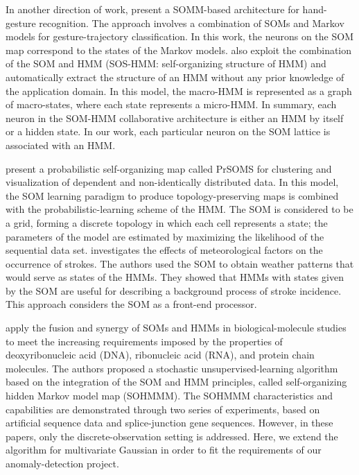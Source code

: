 In another direction of work, \citet{Caridakis2010} present a SOMM-based architecture for hand-gesture recognition. The approach involves a combination of SOMs and Markov models for gesture-trajectory classification. In this work, the neurons on the SOM map correspond to the states of the Markov models. \citet{Jaziri2011} also exploit the combination of the SOM and HMM (SOS-HMM: self-organizing structure of HMM) and automatically extract the structure of an HMM without any prior knowledge of the application domain. In this model, the macro-HMM is represented as a graph of macro-states, where each state represents a micro-HMM. In summary, each neuron in the SOM-HMM collaborative architecture is either an HMM by itself or a hidden state. In our work, each particular neuron on the SOM lattice is associated with an HMM.

\citet{Lebbah2015} present a probabilistic self-organizing map called PrSOMS for clustering and visualization of dependent and non-identically distributed data. In this model, the SOM learning paradigm to produce topology-preserving maps is combined with the probabilistic-learning scheme of the HMM. The SOM is considered to be a grid, forming a discrete topology in which each cell represents a state; the parameters of the model are estimated by maximizing the likelihood of the sequential data set. \citet{Morimoto2016} investigates the effects of meteorological factors on the occurrence of strokes. The authors used the SOM to obtain weather patterns that would serve as states of the HMMs. They showed that HMMs with states given by the SOM are useful for describing a background process of stroke incidence. This approach considers the SOM as a front-end processor.

\citet{Ferles2008,Ferles2013,Ferles2017} apply the fusion and synergy of SOMs and HMMs in biological-molecule studies to meet the increasing requirements imposed by the properties of deoxyribonucleic acid (DNA), ribonucleic acid (RNA), and protein chain molecules. The authors proposed a stochastic unsupervised-learning algorithm based on the integration of the SOM and HMM principles, called self-organizing hidden Markov model map (SOHMMM). The SOHMMM characteristics and capabilities are demonstrated through two series of experiments, based on artificial sequence data and splice-junction gene sequences. However, in these papers, only the discrete-observation setting is addressed. Here, we extend the algorithm for multivariate Gaussian in order to fit the requirements of our anomaly-detection project.

